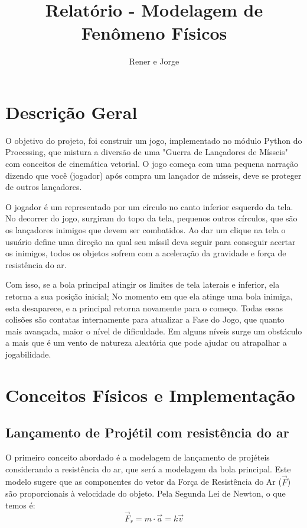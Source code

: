 \documentclass[12pt,letterpaper]{article}
\title{Relatório - Modelagem de Fenômeno Físicos}
\author{Rener e Jorge}
\begin{document}
\maketitle

\section*{Descrição Geral}

O objetivo do projeto, foi construir um jogo, implementado no módulo Python do Processing, que mistura a diversão de uma "Guerra de Lançadores de Mísseis" com conceitos de cinemática vetorial. O jogo começa com uma pequena narração dizendo que você (jogador) após compra um lançador de mísseis, deve se proteger de outros lançadores.

O jogador é um representado por um círculo no canto inferior esquerdo da tela. No decorrer do jogo, surgiram do topo da tela, pequenos outros círculos, que são os lançadores inimigos que devem ser combatidos. Ao dar um clique na tela o usuário define uma direção na qual seu míssil deva seguir para conseguir acertar os inimigos, todos os objetos sofrem com a aceleração da gravidade e força de resistência do ar. 

Com isso, se a bola principal atingir os limites de tela laterais e inferior, ela retorna a sua posição inicial; No momento em que ela atinge uma bola inimiga, esta desaparece, e a principal retorna novamente para o começo. Todas essas colisões são contatas internamente para atualizar a Fase do Jogo, que quanto mais avançada, maior o nível de dificuldade. Em alguns níveis surge um obstáculo a mais que é um vento de natureza aleatória que pode ajudar ou atrapalhar a jogabilidade.

\section*{Conceitos Físicos e Implementação}
\subsection*{Lançamento de Projétil com resistência do ar}
O primeiro conceito abordado é a modelagem de lançamento de projéteis considerando a resistência do ar, que será a modelagem da bola principal. Este modelo sugere que as componentes do vetor da Força de Resistência do Ar ($\vec{F}$) são proporcionais à velocidade do objeto. Pela Segunda Lei de Newton, o que temos é:
$$\vec{F}_r=m\cdot\vec{a}=k\vec{v}$$
\end{document}
